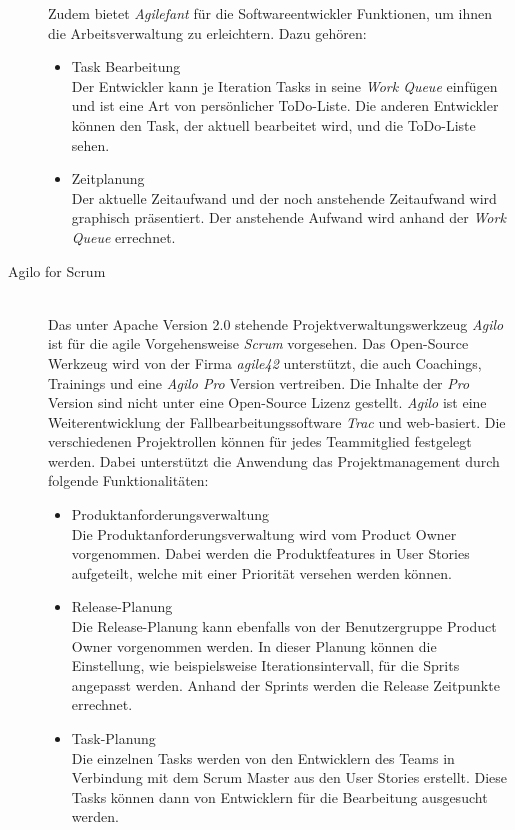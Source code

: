 \begin{description}
Zudem bietet \emph{Agilefant} für die Softwareentwickler Funktionen, um ihnen die Arbeitsverwaltung zu erleichtern. Dazu gehören:
\begin{itemize}
\item Task Bearbeitung\\
Der Entwickler kann je Iteration Tasks in seine \emph{Work Queue} einfügen und ist eine Art von persönlicher ToDo-Liste. Die anderen Entwickler können den Task, der aktuell bearbeitet wird, und die ToDo-Liste sehen.
\item Zeitplanung\\
Der aktuelle Zeitaufwand und der noch anstehende Zeitaufwand wird graphisch präsentiert. Der anstehende Aufwand wird anhand der \emph{Work Queue} errechnet. \cite{bib:agilefant} \\
\end{itemize}

\item[Agilo for Scrum]\hspace*{1em}\\
Das unter Apache Version 2.0 stehende Projektverwaltungswerkzeug \emph{Agilo} ist für die agile Vorgehensweise \emph{Scrum} vorgesehen. Das Open-Source Werkzeug wird von der Firma \emph{agile42} unterstützt, die auch Coachings, Trainings und eine \emph{Agilo Pro} Version vertreiben. Die Inhalte der \emph{Pro} Version sind nicht unter eine Open-Source Lizenz gestellt. \emph{Agilo} ist eine Weiterentwicklung der Fallbearbeitungssoftware \emph{Trac} und web-basiert. Die verschiedenen Projektrollen können für jedes Teammitglied festgelegt werden. Dabei unterstützt die Anwendung das Projektmanagement durch folgende Funktionalitäten:
\begin{itemize}
\item Produktanforderungsverwaltung\\
Die Produktanforderungsverwaltung wird vom Product Owner vorgenommen. Dabei werden die Produktfeatures in User Stories aufgeteilt, welche mit einer Priorität versehen werden können.

\item Release-Planung\\
Die Release-Planung kann ebenfalls von der Benutzergruppe Product Owner vorgenommen werden. In dieser Planung können die Einstellung, wie beispielsweise Iterationsintervall, für die Sprits angepasst werden. Anhand der Sprints werden die Release Zeitpunkte errechnet.

\item Task-Planung\\
Die einzelnen Tasks werden von den Entwicklern des Teams in Verbindung mit dem Scrum Master aus den User Stories erstellt. Diese Tasks können dann von Entwicklern für die Bearbeitung ausgesucht werden.


\end{itemize}
\end{description}
